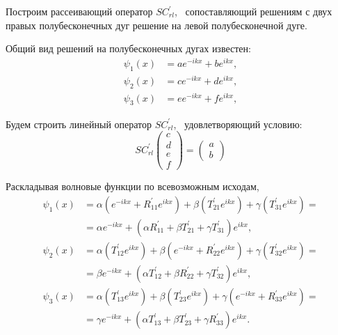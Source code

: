 \documentclass[a4 paper, 12 pt]{extarticle}
\begin{document}
   Построим рассеивающий оператор $SC_{rl}^\prime$, \ сопоставляющий решениям с двух правых полубесконечных дуг решение на левой полубесконечной дуге.
   
   Общий вид решений на полубесконечных дугах известен:
   \begin{equation}
   \label{GeneralizedSolution1}
   \begin{split}
   \psi_1\left(x\right) &= a e^{-ikx} + b e^{ikx}, \\
   \psi_2\left(x\right) &= c e^{-ikx} + d e^{ikx}, \\
   \psi_3\left(x\right) &= e e^{-ikx} + f e^{ikx},
   \end{split}
   \end{equation}
   
   Будем строить линейный оператор $SC_{rl}^\prime$, \ удовлетворяющий условию:
   \[SC_{rl}^\prime\left(
   \begin{array}{c}
   c \\
   d \\
   e \\
   f
   \end{array}\right) = \left(\begin{array}{c}
   a \\
   b
   \end{array}\right)\]
   
   Раскладывая волновые функции по всевозможным исходам,
   \begin{equation}
   \label{GeneralizedSolution2}
   \begin{aligned}
   \psi_1(x) &= \alpha\left(e^{-ikx} + R_{11}^\prime e^{ikx}\right) + \beta\left(T_{21}^\prime e^{ikx}\right) + \gamma \left(T_{31}^\prime e^{ikx}\right) = \\
   &= \alpha e^{-ikx} + \left(\alpha R_{11}^\prime  + \beta T_{21}^\prime  + \gamma T_{31}^\prime \right) e^{ikx}, \\
   \psi_2(x) &= \alpha \left(T_{12}^\prime  e^{ikx}\right) + \beta \left(e^{-ikx} + R_{22}^\prime  e^{ikx}\right) + \gamma \left(T_{32}^\prime  e^{ikx}\right) = \\
   &= \beta e^{-ikx} + \left(\alpha T_{12}^\prime  + \beta R_{22}^\prime  + \gamma T_{32}^\prime \right) e^{ikx}, \\
   \psi_3(x) &= \alpha \left(T_{13}^\prime  e^{ikx}\right) + \beta \left(T_{23}^\prime  e^{ikx}\right) + \gamma \left(e^{-ikx} + R_{33}^\prime  e^{ikx}\right) = \\
   &= \gamma e^{-ikx} + \left(\alpha T_{13}^\prime  + \beta T_{23}^\prime  + \gamma R_{33}^\prime \right) e^{ikx}.
   \end{aligned}
   \end{equation}
   
\end{document}
